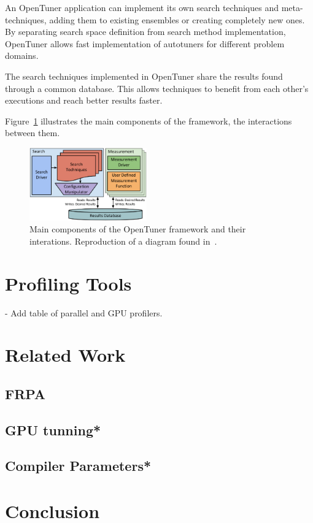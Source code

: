 \documentclass[a4paper, 12pt]{article}
\begin{document}
An OpenTuner application can implement its own search techniques and
meta-techniques, adding them to existing ensembles or creating completely
new ones.
By separating search space definition from search method implementation,
OpenTuner allows fast implementation of autotuners for different
problem domains.

The search techniques implemented in OpenTuner share the results found
through a common database. This allows techniques to benefit from each
other's executions and reach better results faster.

Figure~\ref{fig:opentuner} illustrates the main components of the framework,
the interactions between them.

\begin{figure}[H]
    \centering
    \includegraphics[width=0.45\textwidth]{opentuner}
    \captionsetup{width=0.64\textwidth}
    \caption{Main components of the OpenTuner framework and their interations. Reproduction of a diagram found in~\citet{ansel2014opentuner}.}
    \label{fig:opentuner}
\end{figure}

\section{Profiling Tools} \label{sec:profilers}

- Add table of parallel and GPU profilers.

\section{Related Work} \label{sec:related}

\subsection{FRPA}

\subsection{GPU tunning*}

\subsection{Compiler Parameters*}

\section{Conclusion} \label{sec:conclusion}

 

\end{document}
